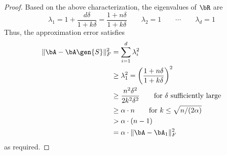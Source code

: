 \begin{proof}
Based on the above characterization, the eigenvalues of $\bR$ are
\[\lambda_1 = 1+\frac{d\delta}{1+k\delta} = \frac{1 + n\delta}{1 + k\delta}\qquad\lambda_2 = 1\qquad\cdots\qquad\lambda_d = 1\]
Thus, the approximation error satisfies
\begin{align*}
    \|\bA - \bA\gen{S}\|^2_F &= \sum_{i=1}^d \lambda_i^2\\
    &\geq \lambda_1^2 = \left(\frac{1+n\delta}{1+k\delta}\right)^2\\
    &\geq \frac{n^2\delta^2}{2 k^2\delta^2}\qquad\text{for $\delta$ sufficiently large}\\
    &\geq \alpha\cdot n\qquad\text{for $k \leq \sqrt{n/(2\alpha)}$}\\
    & > \alpha\cdot(n-1) \\
    &= \alpha\cdot \|\bA-\bA_1\|^2_F
\end{align*}
as required.
\end{proof}

